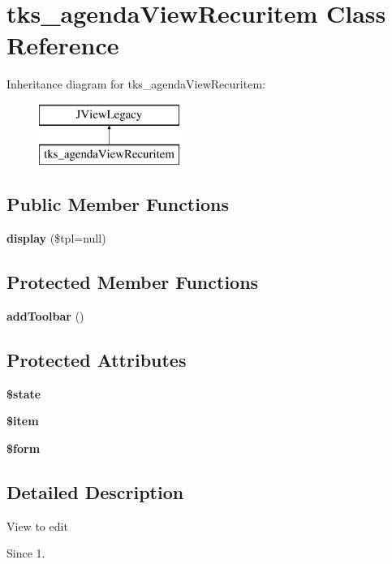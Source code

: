 \section{tks\+\_\+agenda\+View\+Recuritem Class Reference}
\label{classtks__agenda_view_recuritem}
Inheritance diagram for tks\+\_\+agenda\+View\+Recuritem\+:\begin{figure}[H]
\begin{center}
\leavevmode
\includegraphics[height=2.000000cm]{classtks__agenda_view_recuritem}
\end{center}
\end{figure}
\subsection*{Public Member Functions}
\begin{DoxyCompactItemize}
\item 
\textbf{ display} (\$tpl=null)
\end{DoxyCompactItemize}
\subsection*{Protected Member Functions}
\begin{DoxyCompactItemize}
\item 
\textbf{ add\+Toolbar} ()
\end{DoxyCompactItemize}
\subsection*{Protected Attributes}
\begin{DoxyCompactItemize}
\item 
\textbf{ \$state}
\item 
\textbf{ \$item}
\item 
\textbf{ \$form}
\end{DoxyCompactItemize}


\subsection{Detailed Description}
View to edit

\begin{DoxySince}{Since}
1. 
\end{DoxySince}


